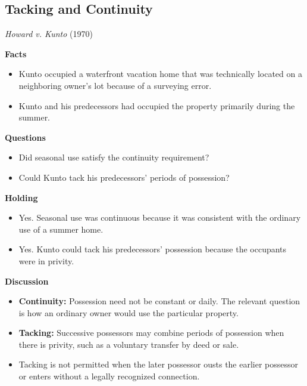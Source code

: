 \documentclass[11pt]{tex/lawoutline}
\begin{document}
\subsection{Tacking and Continuity}

\casebox
{\textit{Howard v. Kunto} (1970)}
{}
{
\textbf{Facts}
\begin{itemize}
    \item Kunto occupied a waterfront vacation home that was technically located on a neighboring owner's lot because of a surveying error.
    \item Kunto and his predecessors had occupied the property primarily during the summer.
\end{itemize}

\textbf{Questions}
\begin{itemize}
    \item Did seasonal use satisfy the continuity requirement?
    \item Could Kunto tack his predecessors' periods of possession?
\end{itemize}

\textbf{Holding}
\begin{itemize}
    \item Yes. Seasonal use was continuous because it was consistent with the ordinary use of a summer home.
    \item Yes. Kunto could tack his predecessors' possession because the occupants were in privity.
\end{itemize}

\textbf{Discussion}
\begin{itemize}
    \item \textbf{Continuity:} Possession need not be constant or daily. The relevant question is how an ordinary owner would use the particular property.
    \item \textbf{Tacking:} Successive possessors may combine periods of possession when there is privity, such as a voluntary transfer by deed or sale.
    \item Tacking is not permitted when the later possessor ousts the earlier possessor or enters without a legally recognized connection.
\end{itemize}
}

\end{document}
